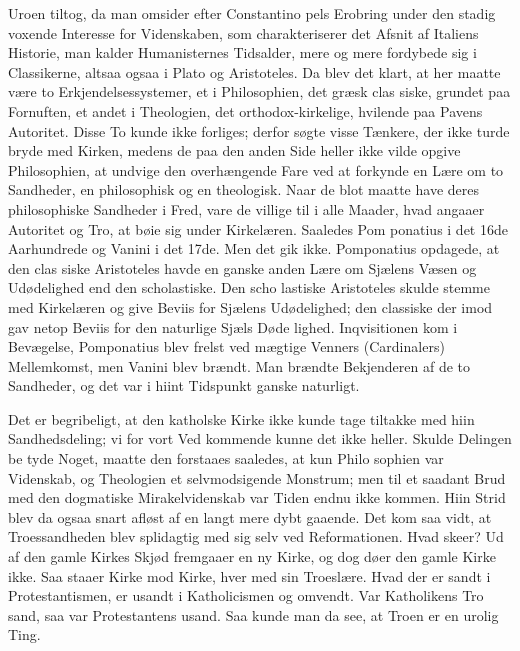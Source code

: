 \documentclass[12pt]{book}
\newcommand{\opage}[1]{\marginnote{\footnotesize\textit{[#1]}}}
\begin{document}
Uroen tiltog, da man omsider efter Constantino\-%
pels Erobring under den stadig voxende Interesse for
Videnskaben, som charakteriserer det Afsnit af Italiens
Historie, man kalder Humanisternes Tidsalder, mere og
mere fordybede sig i Classikerne, altsaa ogsaa i Plato og
Aristoteles. Da blev det klart, at her maatte være to
Erkjendelsessystemer, et i Philosophien, det græsk clas\-%
siske, grundet paa Fornuften, et andet i Theologien, det
orthodox-kirkelige, hvilende paa Pavens Autoritet. Disse
To kunde ikke forliges; derfor søgte visse Tænkere, der
\opage{264}\setcounter{footnote}{0}%
ikke turde bryde med Kirken, medens de paa den anden
Side heller ikke vilde opgive Philosophien, at undvige den
overhængende Fare ved at forkynde en Lære om to
Sandheder, en philosophisk og en theologisk. Naar de
blot maatte have deres philosophiske Sandheder i Fred,
vare de villige til i alle Maader, hvad angaaer Autoritet
og Tro, at bøie sig under Kirkelæren. Saaledes Pom\-%
ponatius i det 16de Aarhundrede og Vanini i det 17de.
Men det gik ikke. Pomponatius opdagede, at den clas\-%
siske Aristoteles havde en ganske anden Lære om Sjælens
Væsen og Udødelighed end den scholastiske. Den scho\-%
lastiske Aristoteles skulde stemme med Kirkelæren og
give Beviis for Sjælens Udødelighed; den classiske der\-%
imod gav netop Beviis for den naturlige Sjæls Døde\-%
lighed. Inqvisitionen kom i Bevægelse, Pomponatius blev
frelst ved mægtige Venners (Cardinalers) Mellemkomst,
men Vanini blev brændt. Man brændte Bekjenderen af
de to Sandheder, og det var i hiint Tidspunkt ganske
naturligt.

Det er begribeligt, at den katholske Kirke ikke kunde
tage tiltakke med hiin Sandhedsdeling; vi for vort Ved\-%
kommende kunne det ikke heller. Skulde Delingen be\-%
tyde Noget, maatte den forstaaes saaledes, at kun Philo\-%
sophien var Videnskab, og Theologien et selvmodsigende
Monstrum; men til et saadant Brud med den dogmatiske
Mirakelvidenskab var Tiden endnu ikke kommen. Hiin
Strid blev da ogsaa snart afløst af en langt mere dybt\-%
gaaende. Det kom saa vidt, at Troessandheden blev
splidagtig med sig selv ved Reformationen. Hvad skeer?
Ud af den gamle Kirkes Skjød fremgaaer en ny Kirke,
og dog døer den gamle Kirke ikke. Saa staaer Kirke
mod Kirke, hver med sin Troeslære. Hvad der er sandt
i Protestantismen, er usandt i Katholicismen og omvendt.
\opage{265}\setcounter{footnote}{0}%
Var Katholikens Tro sand, saa var Protestantens usand.
Saa kunde man da see, at Troen er en urolig Ting.
\end{document}
